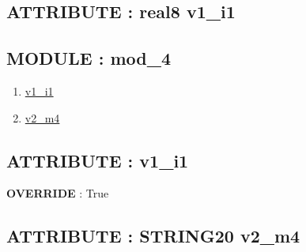 \subsection*{ATTRIBUTE : real8 v1\_i1}
\hypertarget{ecldoc:intest.example_2_intest.example_2.iface_1.v1_i1}{}

\subsection*{MODULE : mod\_4}
\hypertarget{ecldoc:intest.example_2_intest.example_2.mod_4}{}
\begin{enumerate}
\item \hyperlink{ecldoc:intest.example_2_intest.example_2.mod_4.v1_i1}{v1\_i1}
\item \hyperlink{ecldoc:intest.example_2_intest.example_2.mod_4.v2_m4}{v2\_m4}
\end{enumerate}
\subsection*{ATTRIBUTE : v1\_i1}
\hypertarget{ecldoc:intest.example_2_intest.example_2.mod_4.v1_i1}{}
\textbf{OVERRIDE} : True \\
\subsection*{ATTRIBUTE : STRING20 v2\_m4}
\hypertarget{ecldoc:intest.example_2_intest.example_2.mod_4.v2_m4}{}


